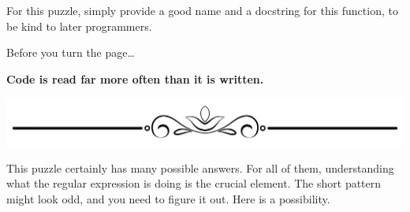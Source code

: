 \begin{Shaded}
\begin{Highlighting}[]
     
\end{Highlighting}
\end{Shaded}

For this puzzle, simply provide a good name and a docstring for this
function, to be kind to later programmers.

Before you turn the page\ldots{}

\textbf{Code is read far more often than it is written.}

\includegraphics{images/Elegant-Flourish-Frame-Extrapolated-19.svg}

\newpage

This puzzle certainly has many possible answers. For all of them,
understanding what the regular expression is doing is the crucial
element. The short pattern might look odd, and you need to figure it
out. Here is a possibility.

\begin{Shaded}
\begin{Highlighting}[]
     
\end{Highlighting}
\end{Shaded}

